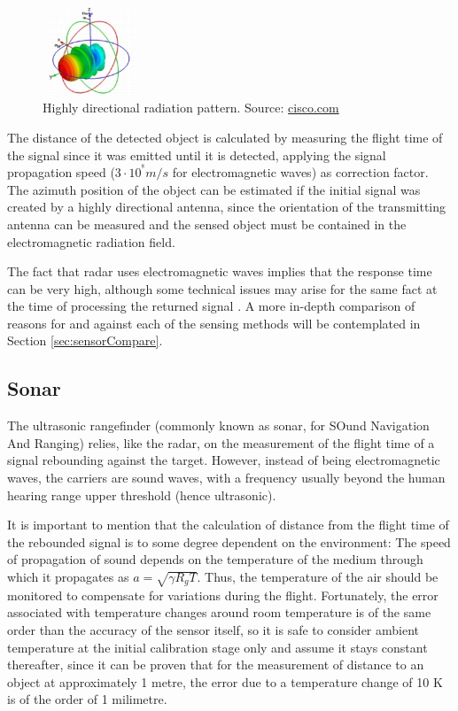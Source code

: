 \begin{figure}
	\centering
	\includegraphics[width=0.25\textwidth]{./figures/antennaPattern.jpg}
	\caption{Highly directional radiation pattern. {\footnotesize Source: \url{cisco.com}}}
	\label{fig:antenna}
\end{figure}
The distance of the detected object is calculated by measuring the flight time of the signal since it was emitted until it is detected, applying the signal propagation speed ($3 \cdot 10^{^8} m/s$ for electromagnetic waves) as correction factor.
The azimuth position of the object can be estimated if the initial signal was created by a highly directional antenna, since the orientation of the transmitting antenna can be measured and the sensed object must be contained in the electromagnetic radiation field.

The fact that radar uses electromagnetic waves implies that the response time can be very high, although some technical issues may arise for the same fact at the time of processing the returned signal \cite{krolik2005}.
A more in-depth comparison of reasons for and against each of the sensing methods will be contemplated in Section \ref{sec:sensorCompare}.

\subsection{Sonar}

The ultrasonic rangefinder (commonly known as sonar, for SOund Navigation And Ranging) relies, like the radar, on the measurement of the flight time of a signal rebounding against the target.
However, instead of being electromagnetic waves, the carriers are sound waves, with a frequency usually beyond the human hearing range upper threshold (hence ultrasonic).

It is important to mention that the calculation of distance from the flight time of the rebounded signal is to some degree dependent on the environment:
The speed of propagation of sound depends on the temperature of the medium through which it propagates as $a=\sqrt{\gamma R_g T}$.
Thus, the temperature of the air should be monitored to compensate for variations during the flight.
Fortunately, the error associated with temperature changes around room temperature is of the same order than the accuracy of the sensor itself, so it is safe to consider ambient temperature at the initial calibration stage only and assume it stays constant thereafter, since it can be proven that for the measurement of distance to an object at approximately 1 metre, the error due to a temperature change of 10 K is of the order of 1 milimetre.

